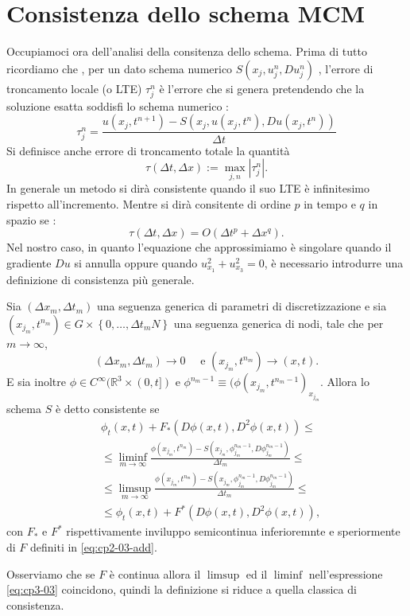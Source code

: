 \section{Consistenza dello schema MCM}
\label{sec:cp3-sc2}
Occupiamoci ora dell'analisi della consitenza dello schema. Prima di tutto ricordiamo che , per un dato schema numerico $S(x_j,u_j^n,Du_j^n)$ , l'errore di troncamento locale (o LTE) $\tau_j^n$ è l'errore che si genera pretendendo che la soluzione esatta soddisfi lo schema numerico :
\[
\tau_j^n=\frac{u(x_j,t^{n+1})-S(x_j,u(x_j,t^n),Du(x_j,t^n))}{\Delta t}
\]
Si definisce anche errore di troncamento totale la quantità
\[
\tau(\Delta t,\Delta x) := \max_{j,n} |\tau_j^n|.
\]
In generale un metodo si dirà consistente quando il suo LTE è infinitesimo rispetto all'incremento. Mentre si dirà consitente di ordine $p$ in tempo e $q$ in spazio se :
\[
\tau(\Delta t,\Delta x) = O(\Delta t^p +\Delta x^q).
\] 
Nel nostro caso, in quanto l'equazione che approssimiamo è singolare quando il gradiente  $Du$ si annulla oppure quando $u_{x_1}^2+u_{x_3}^2=0$, è necessario introdurre una definizione di consistenza più generale.
\begin{definizione}
Sia $(\Delta x_m,\Delta t_m)$ una seguenza generica di parametri di discretizzazione e sia $(x_{j_m},t^{n_m})\in G\times\left\{0,\dots,\Delta t_mN\right\}$ una seguenza generica di nodi, tale che per $m\to\infty$,
\[
(\Delta x_m,\Delta t_m)\to0 \quad\text{ e } (x_{j_m},t^{n_m})\to(x,t).
\]
E sia inoltre $\phi\in C^{\infty}(\mathbb{R}^3\times(0,t])$ e $\phi^{n_m-1}\equiv(\phi(x_{j_m},t^{n_m-1})_{x_{j_m}}$. Allora lo schema $S$ è detto consistente se
\begin{equation}
\label{eq:cp3-03}
\begin{split}
&\phi_t(x,t)+F_*(D\phi(x,t),D^2\phi(x,t))\le \\
&\le\liminf_{m\to\infty}\frac{\phi(x_{j_m},t^{n_m})-S(x_{j_m},\phi_{j_m}^{n_m-1},D\phi_{j_m}^{n_m-1})}{\Delta t_m}\le \\
&\le\limsup_{m\to\infty}\frac{\phi(x_{j_m},t^{n_m})-S(x_{j_m},\phi_{j_m}^{n_m-1},D\phi_{j_m}^{n_m-1})}{\Delta t_m}\le \\
&\le\phi_t(x,t)+F^*(D\phi(x,t),D^2\phi(x,t)),
\end{split}
\end{equation}
con $F_*$ e $F^*$ rispettivamente inviluppo semicontinua inferioremnte
e speriormente di $F$ definiti in \ref{eq:cp2-03-add}.
\end{definizione}
\begin{osservazione}
Osserviamo che se $F$ è continua allora il $\limsup$ ed il $\liminf$ nell'espressione \eqref{eq:cp3-03} coincidono, quindi la definizione si riduce a quella classica di consistenza.
\end{osservazione}

